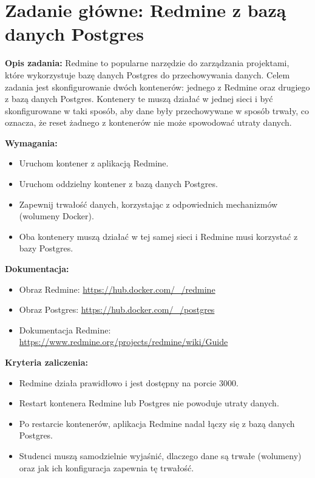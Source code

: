 \documentclass{article}
\begin{document}
\section{Zadanie główne: Redmine z bazą danych Postgres}

\textbf{Opis zadania:}  
Redmine to popularne narzędzie do zarządzania projektami, które wykorzystuje bazę danych Postgres do przechowywania danych. Celem zadania jest skonfigurowanie dwóch kontenerów: jednego z Redmine oraz drugiego z bazą danych Postgres. Kontenery te muszą działać w jednej sieci i być skonfigurowane w taki sposób, aby dane były przechowywane w sposób trwały, co oznacza, że reset żadnego z kontenerów nie może spowodować utraty danych.

\textbf{Wymagania:}
\begin{itemize}
    \item Uruchom kontener z aplikacją Redmine.
    \item Uruchom oddzielny kontener z bazą danych Postgres.
    \item Zapewnij trwałość danych, korzystając z odpowiednich mechanizmów (wolumeny Docker).
    \item Oba kontenery muszą działać w tej samej sieci i Redmine musi korzystać z bazy Postgres.
\end{itemize}

\textbf{Dokumentacja:}
\begin{itemize}
    \item Obraz Redmine: \url{https://hub.docker.com/_/redmine}
    \item Obraz Postgres: \url{https://hub.docker.com/_/postgres}
    \item Dokumentacja Redmine: \url{https://www.redmine.org/projects/redmine/wiki/Guide}
\end{itemize}

\textbf{Kryteria zaliczenia:}
\begin{itemize}
    \item Redmine działa prawidłowo i jest dostępny na porcie 3000.
    \item Restart kontenera Redmine lub Postgres nie powoduje utraty danych.
    \item Po restarcie kontenerów, aplikacja Redmine nadal łączy się z bazą danych Postgres.
    \item Studenci muszą samodzielnie wyjaśnić, dlaczego dane są trwałe (wolumeny) oraz jak ich konfiguracja zapewnia tę trwałość.
\end{itemize}
\end{document}
